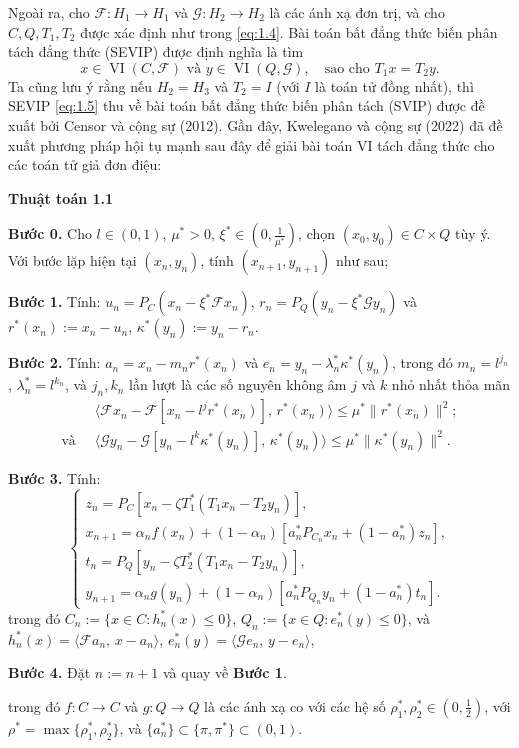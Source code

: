 \documentclass{MyBook}
\theoremstyle{plain}
\theoremstyle{definition}
\theoremstyle{remark}
\numberwithin{equation}{chapter}
\newcommand{\Fc}{\mathcal{F}}
\newcommand{\Gc}{\mathcal{G}}
\newcommand{\inp}[2]{\langle #1,\,#2\rangle}
\newcommand{\nm}[1]{\lVert #1\rVert}
\DeclareMathOperator{\VI}{VI}
\newenvironment{algobox}[1]
  {\par\medskip\noindent\textbf{#1}\par\vspace{-2pt}\noindent\hrulefill\par\nopagebreak\vspace{2pt}}
  {\par\noindent\hrulefill\par\medskip}
\begin{document}
Ngoài ra, cho $\Fc:H_1\to H_1$ và $\Gc:H_2\to H_2$ là các ánh xạ đơn trị, và cho $C,Q,T_1,T_2$ được xác định như trong \eqref{eq:1.4}. Bài toán bất đẳng thức biến phân tách đẳng thức (SEVIP) được định nghĩa là tìm
\begin{equation}
x\in \VI(C,\Fc) \text{ và } y\in \VI(Q,\Gc),\quad \text{sao cho } T_1x=T_2y. \label{eq:1.5}
\end{equation}
Ta cũng lưu ý rằng nếu $H_2=H_3$ và $T_2=I$ (với $I$ là toán tử đồng nhất), thì SEVIP \eqref{eq:1.5} thu về bài toán bất đẳng thức biến phân tách (SVIP) được đề xuất bởi Censor và cộng sự (2012). Gần đây, Kwelegano và cộng sự (2022) đã đề xuất phương pháp hội tụ mạnh sau đây để giải bài toán VI tách đẳng thức cho các toán tử giả đơn điệu:

\begin{algobox}{Thuật toán 1.1}
\textbf{Bước 0.} Cho $l\in(0,1)$, $\mu^{*}>0$, $\xi^{*}\in(0,\tfrac{1}{\mu^{*}})$, chọn $(x_0,y_0)\in C\times Q$ tùy ý. Với bước lặp hiện tại $(x_n,y_n)$, tính $(x_{n+1},y_{n+1})$ như sau;

\smallskip
\textbf{Bước 1.} Tính: $u_n=P_C(x_n-\xi^{*}\Fc x_n)$, $r_n=P_Q(y_n-\xi^{*}\Gc y_n)$ và $r^{*}(x_n):=x_n-u_n$, $\kappa^{*}(y_n):=y_n-r_n$.

\smallskip
\textbf{Bước 2.} Tính: $a_n=x_n-m_n r^{*}(x_n)$ và $e_n=y_n-\lambda_n^{*}\kappa^{*}(y_n)$, trong đó $m_n=l^{j_n}$, $\lambda_n^{*}=l^{k_n}$, và $j_n,k_n$ lần lượt là các số nguyên không âm $j$ và $k$ nhỏ nhất thỏa mãn
\begin{align*}
&\inp{\Fc x_n-\Fc[x_n-l^{j}r^{*}(x_n)]}{r^{*}(x_n)}\le \mu^{*}\nm{r^{*}(x_n)}^2;\\
\text{và }\ &\inp{\Gc y_n-\Gc[y_n-l^{k}\kappa^{*}(y_n)]}{\kappa^{*}(y_n)}\le \mu^{*}\nm{\kappa^{*}(y_n)}^2.
\end{align*}

\smallskip
\textbf{Bước 3.} Tính:
\[
\begin{cases}
z_n=P_C[x_n-\zeta T_1^{*}(T_1x_n-T_2y_n)],\\
x_{n+1}=\alpha_n f(x_n)+(1-\alpha_n)[a_n^{*}P_{C_n}x_n+(1-a_n^{*})z_n],\\
t_n=P_Q[y_n-\zeta T_2^{*}(T_1x_n-T_2y_n)],\\
y_{n+1}=\alpha_n g(y_n)+(1-\alpha_n)[a_n^{*}P_{Q_n}y_n+(1-a_n^{*})t_n].
\end{cases}
\]
trong đó $C_n:=\{x\in C:h_n^{*}(x)\le 0\}$, $Q_n:=\{x\in Q:e_n^{*}(y)\le 0\}$, và $h_n^{*}(x)=\inp{\Fc a_n}{x-a_n}$, $e_n^{*}(y)=\inp{\Gc e_n}{y-e_n}$,

\smallskip
\textbf{Bước 4.} Đặt $n:=n+1$ và quay về \textbf{Bước 1}.

\smallskip
trong đó $f:C\to C$ và $g:Q\to Q$ là các ánh xạ co với các hệ số $\rho_1^{*},\rho_2^{*}\in(0,\tfrac{1}{2})$, với $\rho^{*}=\max\{\rho_1^{*},\rho_2^{*}\}$, và $\{a_n^{*}\}\subset\{\pi,\pi^{*}\}\subset(0,1)$.
\end{algobox}
\end{document}
